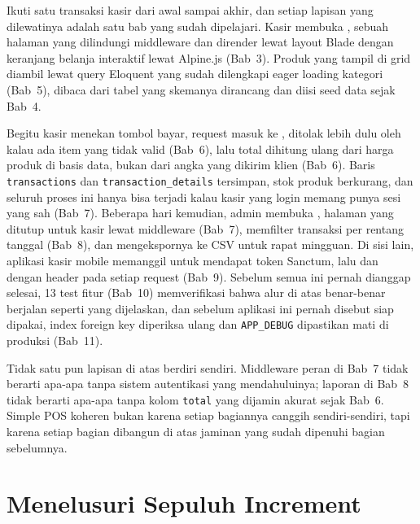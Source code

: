 Ikuti satu transaksi kasir dari awal sampai akhir, dan setiap lapisan
yang dilewatinya adalah satu bab yang sudah dipelajari. Kasir membuka
, sebuah halaman yang dilindungi middleware 
dan dirender lewat layout Blade dengan keranjang belanja interaktif
lewat Alpine.js (Bab~3). Produk yang tampil di grid diambil lewat query
Eloquent yang sudah dilengkapi eager loading kategori (Bab~5), dibaca
dari tabel yang skemanya dirancang dan diisi seed data sejak Bab~4.

Begitu kasir menekan tombol bayar, request masuk ke
, ditolak lebih dulu oleh
 kalau ada item yang tidak valid
(Bab~6), lalu total dihitung ulang dari harga produk di basis data,
bukan dari angka yang dikirim klien (Bab~6). Baris \texttt{transactions}
dan \texttt{transaction\_details} tersimpan, stok produk berkurang, dan
seluruh proses ini hanya bisa terjadi kalau kasir yang login memang
punya sesi yang sah (Bab~7). Beberapa hari kemudian, admin membuka
, halaman yang ditutup untuk kasir lewat middleware
 (Bab~7), memfilter transaksi per rentang tanggal
(Bab~8), dan mengekspornya ke CSV untuk rapat mingguan. Di sisi lain,
aplikasi kasir mobile memanggil  untuk mendapat
token Sanctum, lalu  dan  dengan header  pada
setiap request (Bab~9). Sebelum semua ini pernah dianggap selesai, 13
test fitur (Bab~10) memverifikasi bahwa alur di atas benar-benar
berjalan seperti yang dijelaskan, dan sebelum aplikasi ini pernah
disebut siap dipakai, index foreign key diperiksa ulang dan
\texttt{APP\_DEBUG} dipastikan mati di produksi (Bab~11).

\begin{notebox}
Tidak satu pun lapisan di atas berdiri sendiri. Middleware peran di
Bab~7 tidak berarti apa-apa tanpa sistem autentikasi yang mendahuluinya;
laporan di Bab~8 tidak berarti apa-apa tanpa kolom \texttt{total} yang
dijamin akurat sejak Bab~6. Simple POS koheren bukan karena setiap
bagiannya canggih sendiri-sendiri, tapi karena setiap bagian dibangun
di atas jaminan yang sudah dipenuhi bagian sebelumnya.
\end{notebox}

\section{Menelusuri Sepuluh Increment}
\label{sec:studi-kasus-menyeluruh-2}

